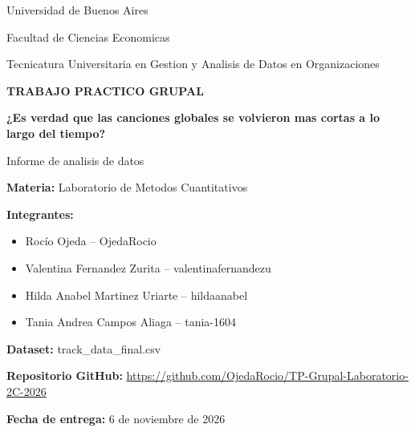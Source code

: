 \documentclass[11pt,a4paper]{article}
\begin{document}
\begin{titlepage}
    \centering

    {\large Universidad de Buenos Aires\par}
    \vspace{0.3cm}
    {\large Facultad de Ciencias Economicas\par}

    \vspace{1.5cm}

    {\large Tecnicatura Universitaria en
    Gestion y Analisis de Datos en Organizaciones\par}

    \vspace{1.5cm}

    {\Large\bfseries TRABAJO PRACTICO GRUPAL\par}

    \vspace{0.8cm}

    {\LARGE\bfseries
    ¿Es verdad que las canciones globales
    se volvieron mas cortas a lo largo del tiempo?\par}

    \vspace{1cm}

    {\large Informe de analisis de datos\par}

    \vfill

    \begin{flushleft}
        \textbf{Materia:} Laboratorio de Metodos Cuantitativos

        \vspace{0.3cm}

        \textbf{Integrantes:}
        \begin{itemize}
            \item Rocío Ojeda -- OjedaRocio
            \item Valentina Fernandez Zurita -- valentinafernandezu
            \item Hilda Anabel Martinez Uriarte -- hildaanabel
            \item Tania Andrea Campos Aliaga -- tania-1604
        \end{itemize}

        \textbf{Dataset:} track\_data\_final.csv

        \textbf{Repositorio GitHub:}
        \url{https://github.com/OjedaRocio/TP-Grupal-Laboratorio-2C-2026}

        \textbf{Fecha de entrega:} 6 de noviembre de 2026
    \end{flushleft}

\end{titlepage}
\end{document}
